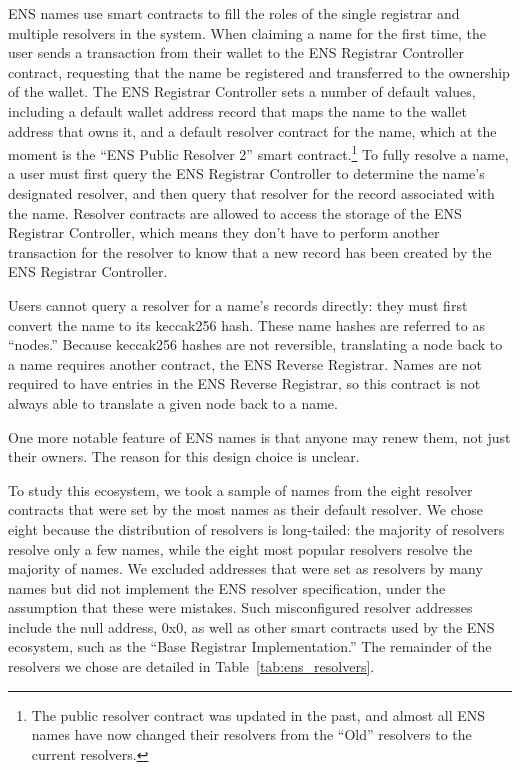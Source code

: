 \documentclass[10pt,sigconf,letterpaper]{acmart}
\begin{document}
ENS names use smart contracts to fill the roles of the single registrar and 
multiple resolvers in the system. When claiming a name for the first 
time, the user sends a transaction from their wallet to the ENS Registrar 
Controller 
contract, requesting that the name be registered and transferred to the 
ownership of the wallet. The ENS Registrar Controller sets a number of default 
values, including a default wallet 
address record that maps the name to the wallet address that owns it, and a 
default resolver contract for the 
name, which at the moment is the ``ENS Public Resolver 2'' smart 
contract.\footnote{The public 
resolver contract was updated in the past, and almost all ENS names have now 
changed their resolvers 
from the ``Old'' resolvers to the current resolvers.} To fully 
resolve a 
name, a user must first query the ENS Registrar Controller to determine the 
name's designated resolver, and then query that resolver for the record 
associated with the name. Resolver contracts are allowed to access the storage 
of the ENS Registrar Controller, which means they don't have to perform another 
transaction for the resolver to know that a new record has been created by the 
ENS Registrar Controller. 

Users cannot query a resolver for a name's records directly: they must first 
convert the name to its keccak256 hash. These 
name hashes are referred to as ``nodes.'' Because keccak256 hashes are not 
reversible, 
translating a node back to a name requires another contract, the ENS Reverse 
Registrar. Names are not required to have entries in the ENS Reverse Registrar, 
so this contract is not always able to translate a given node 
back to a name. 

One more notable feature of ENS names is that anyone may renew 
them, not just their owners. The reason for this design choice 
is unclear.

To study this ecosystem, we took a sample of names from the eight resolver 
contracts that were set by the most names as their default resolver. We chose 
eight because the distribution of resolvers is long-tailed: the majority of 
resolvers resolve only a few names, while the eight most popular resolvers 
resolve the majority of names. We excluded addresses that were set as resolvers 
by many names but did not implement the ENS resolver specification, under the 
assumption that these were mistakes. Such misconfigured resolver addresses 
include the null address, 
0x0, as well as other smart contracts used by the ENS ecosystem, such as the 
``Base Registrar Implementation.''  The remainder of the resolvers we chose are 
detailed in Table~\ref{tab:ens_resolvers}.
\end{document}
